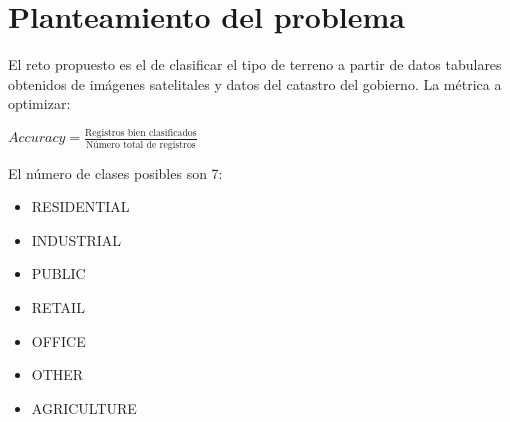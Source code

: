 \section{Planteamiento del problema}
El reto propuesto es el de clasificar el tipo de terreno a partir de datos tabulares obtenidos de imágenes satelitales\cite{datosSatelite} y datos del catastro del gobierno\cite{datosCatastro}.
La métrica a optimizar:
\begin{center}
$Accuracy=\frac{\text{Registros bien clasificados}}{\text{Número total de registros}}$
\end{center}
El número de clases posibles son 7:
\begin{itemize}
    \item RESIDENTIAL
    \item INDUSTRIAL
    \item PUBLIC
    \item RETAIL
    \item OFFICE
    \item OTHER
    \item AGRICULTURE
\end{itemize}